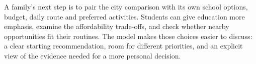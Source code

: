 A family's next step is to pair the city comparison with its own school options, budget, daily route and preferred activities. Students can give education more emphasis, examine the affordability trade-offs, and check whether nearby opportunities fit their routines. The model makes those choices easier to discuss: a clear starting recommendation, room for different priorities, and an explicit view of the evidence needed for a more personal decision.
